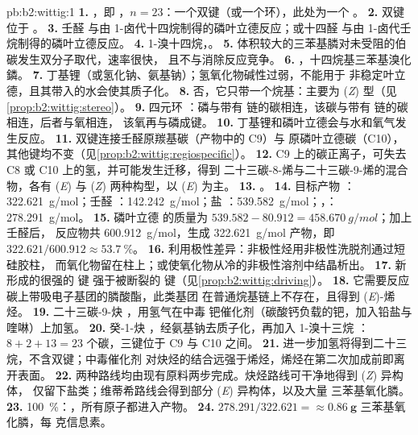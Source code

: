 \begin{solution}{pb:b2:wittig:1}
\textbf{1.} ，即 ，$n = 23$：一个双键（或一个环），此处为一个
。
\textbf{2.} 双键位于 。
\textbf{3.} 壬醛  与由 1-卤代十四烷制得的磷叶立德反应；或十四醛
 与由 1-卤代壬烷制得的磷叶立德反应。
\textbf{4.} 1-溴十四烷，。
\textbf{5.} 体积较大的三苯基膦对未受阻的伯碳发生双分子取代，速率很快，
且不与消除反应竞争。
\textbf{6.} ，十四烷基三苯基溴化鏻。
\textbf{7.} 丁基锂（或氢化钠、氨基钠）；氢氧化物碱性过弱，不能用于
非稳定叶立德，且其带入的水会使其质子化。
\textbf{8.} 否，它只带一个烷基：主要为 (\textit{Z}) 型（见\cref{prop:b2:wittig:stereo}）。
\textbf{9.} 四元环 ：磷与带有
 链的碳相连，该碳与带有  链的碳相连，后者与氧相连，
该氧再与磷成键。
\textbf{10.} 丁基锂和磷叶立德会与水和氧气发生反应。
\textbf{11.} 双键连接壬醛原羰基碳（产物中的 C9）与
原磷叶立德碳（C10），其他键均不变（见\cref{prop:b2:wittig:regiospecific}）。
\textbf{12.} C9 上的碳正离子，可失去 C8 或 C10 上的氢，并可能发生迁移，得到
二十三碳-8-烯与二十三碳-9-烯的混合物，各有 (\textit{E}) 与 (\textit{Z}) 两种构型，以 (\textit{E}) 为主。
\textbf{13.} 。
\textbf{14.} 目标产物 ：\qty{322.621}{g/mol}；壬醛 ：\qty{142.242}{g/mol}；盐
：\qty{539.582}{g/mol}；，：\qty{278.291}{g/mol}。
\textbf{15.} 磷叶立德  的质量为 $539.582 - 80.912 = \qty{458.670}{g/mol}$；加上壬醛后，
反应物共 \qty{600.912}{g/mol}，生成 \qty{322.621}{g/mol} 产物，即 $322.621/600.912 \approx
53.7~\%$。
\textbf{16.} 利用极性差异：非极性烃用非极性洗脱剂通过短硅胶柱，
而氧化物留在柱上；或使氧化物从冷的非极性溶剂中结晶析出。
\textbf{17.} 新形成的很强的  键
强于被断裂的  键（见\cref{prop:b2:wittig:driving}）。
\textbf{18.} 它需要反应碳上带吸电子基团的膦酸酯，此类基团
在普通烷基链上不存在，且得到 (\textit{E})-烯烃。
\textbf{19.} 二十三碳-9-炔 ，用氢气在中毒
钯催化剂（碳酸钙负载的钯，加入铅盐与喹啉）上加氢。
\textbf{20.} 癸-1-炔 ，经氨基钠去质子化，再加入 1-溴十三烷
：$8 + 2 + 13 = 23$ 个碳，三键位于 C9 与 C10 之间。
\textbf{21.} 进一步加氢将得到二十三烷，不含双键；中毒催化剂
对炔烃的结合远强于烯烃，烯烃在第二次加成前即离开表面。
\textbf{22.} 两种路线均由现有原料两步完成。炔烃路线可干净地得到 (\textit{Z}) 异构体，
仅留下盐类；维蒂希路线会得到部分 (\textit{E}) 异构体，以及大量
三苯基氧化膦。
\textbf{23.} 100~\%：，所有原子都进入产物。
\textbf{24.} $278.291/322.621 = \boldsymbol{\approx \qty{0.86}{g}}$ 三苯基氧化膦，每
克信息素。
\end{solution}
